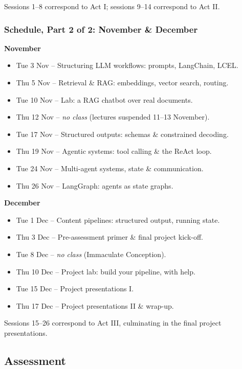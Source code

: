 Sessions 1--8 correspond to Act I; sessions 9--14 correspond to Act II.

\subsubsection{Schedule, Part 2 of 2: November \& December}

\textbf{November}
\begin{itemize}
    \item[15.] Tue 3 Nov -- Structuring LLM workflows: prompts, LangChain, LCEL.
    \item[16.] Thu 5 Nov -- Retrieval \& RAG: embeddings, vector search, routing.
    \item[17.] Tue 10 Nov -- Lab: a RAG chatbot over real documents.
    \item[--] Thu 12 Nov -- \emph{no class} (lectures suspended 11--13 November).
    \item[18.] Tue 17 Nov -- Structured outputs: schemas \& constrained decoding.
    \item[19.] Thu 19 Nov -- Agentic systems: tool calling \& the ReAct loop.
    \item[20.] Tue 24 Nov -- Multi-agent systems, state \& communication.
    \item[21.] Thu 26 Nov -- LangGraph: agents as state graphs.
\end{itemize}

\textbf{December}
\begin{itemize}
    \item[22.] Tue 1 Dec -- Content pipelines: structured output, running state.
    \item[23.] Thu 3 Dec -- Pre-assessment primer \& final project kick-off.
    \item[--] Tue 8 Dec -- \emph{no class} (Immaculate Conception).
    \item[24.] Thu 10 Dec -- Project lab: build your pipeline, with help.
    \item[25.] Tue 15 Dec -- Project presentations I.
    \item[26.] Thu 17 Dec -- Project presentations II \& wrap-up.
\end{itemize}

Sessions 15--26 correspond to Act III, culminating in the final project presentations.

\subsection{Assessment}

